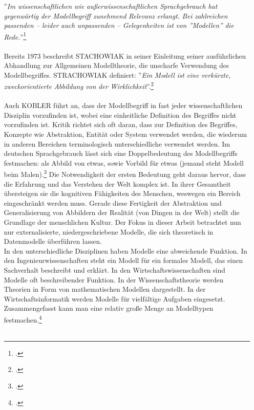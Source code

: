 \documentclass[12pt,a4paper]{article}
\begin{document}
''\textit{Im wissenschaftlichen wie außerwissenschaftlichen Sprachgebrauch hat gegenwärtig der Modellbegriff zunehmend Relevanz erlangt. Bei zahlreichen passenden -- leider auch unpassenden -- Gelegenheiten ist von ''Modellen'' die Rede.}''\footcite[][S.1]{stachowiak1973allgemeine}
\\
\\
Bereits 1973 beschreibt STACHOWIAK in seiner Einleitung seiner ausführlichen Abhandlung zur Allgemeinen Modelltheorie, die unscharfe Verwendung des Modellbegriffes. STRACHOWIAK definiert: ''\textit{Ein Modell ist eine verkürzte, zweckorientierte Abbildung von der Wirklichkeit}''.\footcite[][]{stachowiak1973allgemeine}
\\
\\
Auch KOBLER führt an, dass der Modellbegriff in fast jeder wissenschaftlichen Disziplin vorzufinden ist, wobei eine einheitliche Definition des Begriffes nicht vorzufinden ist. Kritik richtet sich oft daran, dass zur Definition des Begriffes, Konzepte wie Abstraktion, Entität oder System verwendet werden, die wiederum in anderen Bereichen terminologisch unterschiedliche verwendet werden.
Im deutschen Sprachgebrauch lässt sich eine Doppelbedeutung des Modellbegriffs festmachen: als Abbild von etwas, sowie Vorbild für etwas (jemand steht Modell beim Malen).\footcite[][S.129]{stachowiak1973allgemeine} Die Notwendigkeit der ersten Bedeutung geht daraus hervor, dass die Erfahrung und das Verstehen der Welt komplex ist. In ihrer Gesamtheit übersteigen sie die kognitiven Fähigkeiten des Menschen, weswegen ein Bereich eingeschränkt werden muss. Gerade diese Fertigkeit der Abstraktion und Generalisierung von Abbildern der Realität (von Dingen in der Welt) stellt die Grundlage der menschlichen Kultur. Der Fokus in dieser Arbeit betrachtet nun nur externalisierte, niedergeschriebene Modelle, die sich theoretisch in Datenmodelle überführen lassen. 
\\
In den unterschiedliche Disziplinen haben Modelle eine abweichende Funktion. In den Ingenieurwissenschaften steht ein Modell für ein formales Modell, das einen Sachverhalt beschreibt und erklärt. In den Wirtschaftswissenschaften sind Modelle oft beschreibender Funktion. In der Wissenschaftstheorie werden Theorien in Form von mathematischen Modellen dargestellt. In der Wirtschaftsinformatik werden Modelle für vielfältige Aufgaben eingesetzt. Zusammengefasst kann man eine relativ große Menge an Modelltypen festmachen.\footcite[][S.41-44]{kobler2010qualitat}
\\
\\
\end{document}
